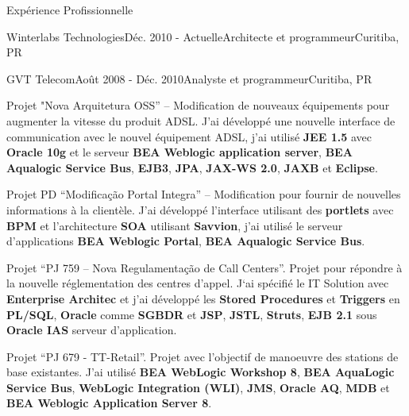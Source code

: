 \documentclass{resume}
\begin{document}
\begin{rSection}{Expérience Profissionnelle}
\begin{rSubsection}{Winterlabs Technologies}{Déc. 2010 - 
Actuelle}{Architecte et programmeur}{Curitiba, PR}
    \end{rSubsection}
    \begin{rSubsection}{GVT Telecom}{Août 2008 - Déc. 2010}{Analyste et programmeur}{Curitiba, PR}
    \item Projet "Nova Arquitetura OSS” – Modification de nouveaux équipements pour augmenter la vitesse du produit ADSL. J'ai développé une nouvelle interface de communication avec le nouvel équipement ADSL, j'ai utilisé \textbf{JEE 1.5} avec \textbf{Oracle 10g} et le serveur \textbf{BEA Weblogic application server}, \textbf{BEA Aqualogic Service Bus}, \textbf{EJB3}, \textbf{JPA}, \textbf{JAX-WS 2.0}, \textbf{JAXB} et \textbf{Eclipse}.\\
    \item Projet PD “Modificação Portal Integra” – Modification pour fournir de nouvelles informations à la clientèle. J'ai développé l'interface  utilisant des \textbf{portlets} avec \textbf{BPM} et l'architecture \textbf{SOA} utilisant \textbf{Savvion}, j'ai utilisé le serveur d'applications \textbf{BEA Weblogic Portal}, \textbf{BEA Aqualogic Service Bus}.\\
    \item Projet “PJ 759 – Nova Regulamentação de Call Centers”. Projet pour répondre à la nouvelle réglementation des centres d'appel. J‘ai spécifié le IT Solution avec \textbf{Enterprise Architec} et j'ai développé les \textbf{Stored Procedures} et \textbf{Triggers} en \textbf{PL/SQL}, \textbf{Oracle} comme \textbf{SGBDR} et \textbf{JSP}, \textbf{JSTL}, \textbf{Struts}, \textbf{EJB 2.1} sous \textbf{Oracle IAS} serveur d'application.\\
    \item Projet “PJ 679 - TT-Retail”. Projet avec l’objectif de manoeuvre des stations de base existantes. J’ai utilisé \textbf{BEA WebLogic Workshop 8}, \textbf{BEA AquaLogic Service Bus}, \textbf{WebLogic Integration (WLI)}, \textbf{JMS}, \textbf{Oracle AQ}, \textbf{MDB} et \textbf{BEA Weblogic Application Server 8}.\\

\end{rSubsection}
\end{rSection}
\end{document}
